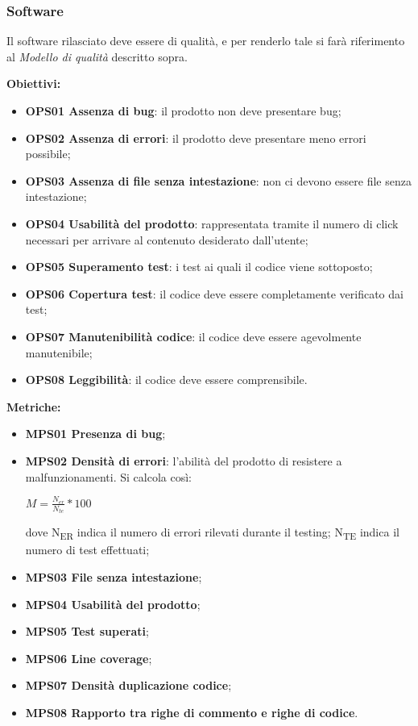 \documentclass[../piano_di_qualifica.tex]{subfiles}
\begin{document}
\subsubsection{Software}
Il software rilasciato deve essere di qualità, e per renderlo tale si farà riferimento al \emph{Modello di qualità} descritto sopra.

\textbf{Obiettivi:}
\smallbreak
\begin{itemize}
	\item \textbf{OPS01 Assenza di bug}: il prodotto non deve presentare bug;
	\item \textbf{OPS02 Assenza di errori}: il prodotto deve presentare meno errori possibile;
	\item \textbf{OPS03 Assenza di file senza intestazione}: non ci devono essere file senza intestazione;
	\item \textbf{OPS04 Usabilità del prodotto}: rappresentata tramite il numero di click necessari per arrivare al contenuto desiderato dall'utente;
	\item \textbf{OPS05 Superamento test}: i test ai quali il codice viene sottoposto;
	\item \textbf{OPS06 Copertura test}: il codice deve essere completamente verificato dai test;
	\item \textbf{OPS07 Manutenibilità codice}: il codice deve essere agevolmente manutenibile;
	\item \textbf{OPS08 Leggibilità}: il codice deve essere comprensibile.
\end{itemize}

\textbf{Metriche:}
\smallbreak
\begin{itemize}
	\item \textbf{MPS01 Presenza di bug};
	\item \textbf{MPS02 Densità di errori}: l'abilità del prodotto di resistere a malfunzionamenti. Si calcola così:
	      \begin{center} $M = \frac{N_{er}}{N_{te}} * 100$ \end{center}
	      dove
	      \subitem N\textsubscript{ER} indica il numero di errori rilevati durante il testing;
	      \subitem N\textsubscript{TE} indica il numero di test effettuati;
	\item \textbf{MPS03 File senza intestazione};
	\item \textbf{MPS04 Usabilità del prodotto};
	\item \textbf{MPS05 Test superati};
	\item \textbf{MPS06 Line coverage};
	\item \textbf{MPS07 Densità duplicazione codice};
	\item \textbf{MPS08 Rapporto tra righe di commento e righe di codice}.
\end{itemize}
\end{document}
